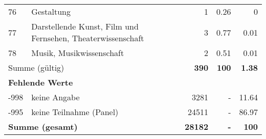 \begin{longtable}{lXrrr}
        76 & \multicolumn{1}{X}{Gestaltung} & %
          \num{1} &
          \num[round-mode=places,round-precision=2]{0,26} &
          \num[round-mode=places,round-precision=2]{0} \\

        77 & \multicolumn{1}{X}{Darstellende Kunst, Film und Fernsehen, Theaterwissenschaft} & %
          \num{3} &
          \num[round-mode=places,round-precision=2]{0,77} &
          \num[round-mode=places,round-precision=2]{0,01} \\

        78 & \multicolumn{1}{X}{Musik, Musikwissenschaft} & %
          \num{2} &
          \num[round-mode=places,round-precision=2]{0,51} &
          \num[round-mode=places,round-precision=2]{0,01} \\

     \midrule
     \multicolumn{2}{l}{Summe (gültig)} &
       \textbf{\num{390}} &
     \textbf{100} &
       \textbf{\num[round-mode=places,round-precision=2]{1,38}} \\
     \multicolumn{5}{l}{\textbf{Fehlende Werte}}\\
       -998 &
       keine Angabe &
         \num{3281} &
        - &
         \num[round-mode=places,round-precision=2]{11,64} \\
       -995 &
       keine Teilnahme (Panel) &
         \num{24511} &
        - &
         \num[round-mode=places,round-precision=2]{86,97} \\
     \midrule
     \multicolumn{2}{l}{\textbf{Summe (gesamt)}} &
          \textbf{\num{28182}} &
        \textbf{-} &
        \textbf{100} \\
     \bottomrule
     \end{longtable}
     
